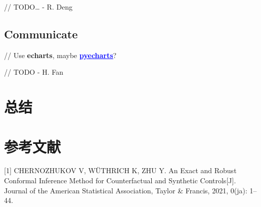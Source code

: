 \documentclass[]{ctexart}
\let\oldhref\href
\renewcommand{\href}[2]{\oldhref{#1}{\textcolor{blue}{\underline{#2}}}}
\begin{document}
// TODO\ldots{} - R. Deng

\hypertarget{communicate}{%
\subsection{Communicate}\label{communicate}}

// Use \textbf{echarts}, maybe
\href{https://github.com/pyecharts}{\textbf{pyecharts}}?

// TODO - H. Fan

\hypertarget{ux603bux7ed3}{%
\section{总结}\label{ux603bux7ed3}}

\hypertarget{ux53c2ux8003ux6587ux732e}{%
\section*{参考文献}\label{ux53c2ux8003ux6587ux732e}}

\hypertarget{refs}{}
\leavevmode\hypertarget{ref-doi:10.1080ux2f01621459.2021.1920957}{}%
{[}1{]} CHERNOZHUKOV V, WÜTHRICH K, ZHU Y. An Exact and Robust Conformal
Inference Method for Counterfactual and Synthetic Controls{[}J{]}.
Journal of the American Statistical Association, Taylor \& Francis,
2021, 0(ja): 1--44.
\end{document}

